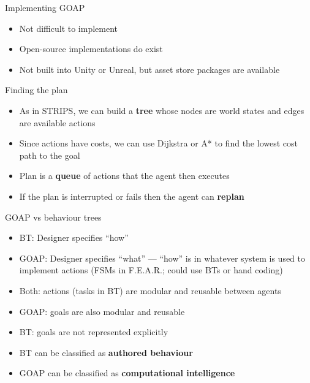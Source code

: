 \begin{frame}{Implementing GOAP}
    \begin{itemize}
        \pause\item Not difficult to implement
        \pause\item Open-source implementations do exist
        \pause\item Not built into Unity or Unreal, but asset store packages are available
    \end{itemize}
\end{frame}

\begin{frame}{Finding the plan}
    \begin{itemize}
        \pause\item As in STRIPS, we can build a \textbf{tree} whose nodes are world states and edges are available actions
        \pause\item Since actions have costs, we can use Dijkstra or A* to find the lowest cost path to the goal
        \pause\item Plan is a \textbf{queue} of actions that the agent then executes
        \pause\item If the plan is interrupted or fails then the agent can \textbf{replan}
    \end{itemize}
\end{frame}

\begin{frame}{GOAP vs behaviour trees}
    \begin{itemize}
        \pause\item BT: Designer specifies ``how''
        \pause\item GOAP: Designer specifies ``what'' --- ``how'' is in whatever system is used to implement
            actions (FSMs in F.E.A.R.; could use BTs or hand coding)
        \pause\item Both: actions (tasks in BT) are modular and reusable between agents
        \pause\item GOAP: goals are also modular and reusable
        \pause\item BT: goals are not represented explicitly
        \pause\item BT can be classified as \textbf{authored behaviour}
        \pause\item GOAP can be classified as \textbf{computational intelligence}
    \end{itemize}
\end{frame}

